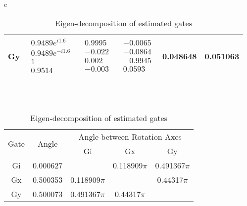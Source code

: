 \documentclass{beamer}
\begin{document}
\begin{frame}
\begin{table}[h]
\begin{center}
{\begin{tabular}{c}
\begin{tabular}[l]{|c|c|c|c|c|c|}
Gy & $ \begin{array}{c}
0.9489e^{i1.6} \\ 
0.9489e^{-i1.6} \\ 
1 \\ 
0.9514
 \end{array} $
 & $ \begin{array}{c}
0.9995 \\ 
-0.022 \\ 
0.002 \\ 
-0.003
 \end{array} $
 & $ \begin{array}{c}
-0.0065 \\ 
-0.0864 \\ 
-0.9945 \\ 
0.0593
 \end{array} $
 & 0.048648 & 0.051063 \\ \hline
\end{tabular}

\\
\vspace{2em}
\\
\begin{tabular}[l]{|c|c|c|c|c|}
\hline
\multirow{2}{*}{Gate} & \multirow{2}{*}{Angle} & \multicolumn{3}{c|}{Angle between Rotation Axes} \\ \cline{3-5}
 & & Gi & Gx & Gy \\ \hline
Gi & 0.000627 &  & 0.118909$\pi$ & 0.491367$\pi$ \\ \hline
Gx & 0.500353 & 0.118909$\pi$ &  & 0.44317$\pi$ \\ \hline
Gy & 0.500073 & 0.491367$\pi$ & 0.44317$\pi$ &  \\ \hline
\end{tabular}

\end{tabular}
}
\caption{Eigen-decomposition of estimated gates}
\end{center}
\end{table}

\end{frame}
\end{document}
